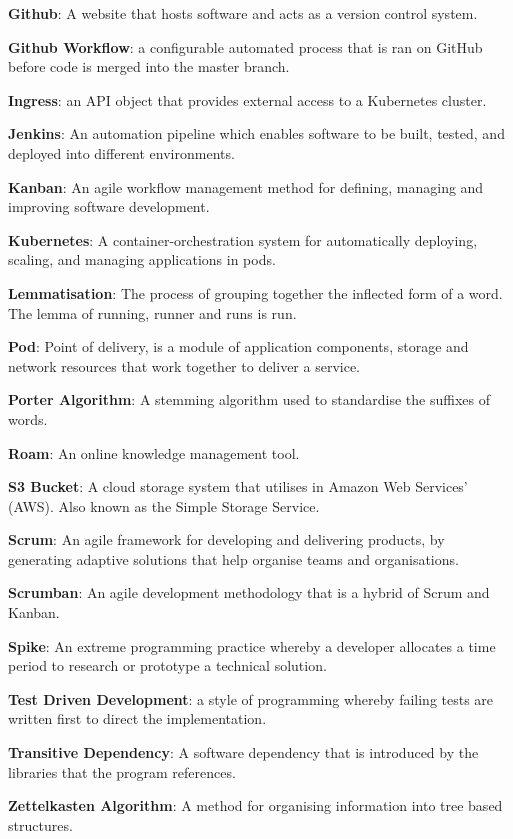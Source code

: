 \documentclass{article}
\begin{document}
{\textbf{Github}: A website that hosts software and acts as a version control system.

\textbf{Github Workflow}: a configurable automated process that is ran on GitHub before code is merged into the master branch.

\textbf{Ingress}: an API object that provides external access to a Kubernetes cluster.

\textbf{Jenkins}: An automation pipeline which enables software to be built, tested, and deployed into different environments.

\textbf{Kanban}: An agile workflow management method for defining, managing and improving software development.

\textbf{Kubernetes}: A container-orchestration system for automatically deploying, scaling, and managing applications in pods.

\textbf{Lemmatisation}: The process of grouping together the inflected form of a word. The lemma of running, runner and runs is run.

\textbf{Pod}: Point of delivery, is a module of application components, storage and network resources that work together to deliver a service.

\textbf{Porter Algorithm}: A stemming algorithm used to standardise the suffixes of words.

\textbf{Roam}: An online knowledge management tool.

\textbf{S3 Bucket}: A cloud storage system that utilises in Amazon Web Services' (AWS). Also known as the Simple Storage Service.

\textbf{Scrum}: An agile framework for developing and delivering products, by generating adaptive solutions that help organise teams and organisations.

\textbf{Scrumban}: An agile development methodology that is a hybrid of Scrum and Kanban.

\textbf{Spike}: An extreme programming practice whereby a developer allocates a time period to research or prototype a technical solution.

\textbf{Test Driven Development}: a style of programming whereby failing tests are written first to direct the implementation.

\textbf{Transitive Dependency}: A software dependency that is introduced by the libraries that the program references.

\textbf{Zettelkasten Algorithm}: A method for organising information into tree based structures.

}
\newpage
\end{document}
